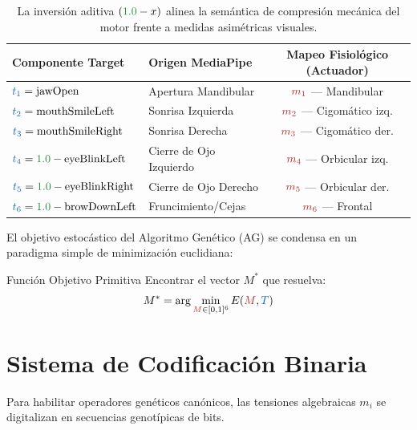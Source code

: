 \documentclass[11pt, a4paper]{article}
\begin{document}
\begin{table}[H]
    \centering
    \begin{tabular}{@{}llc@{}}
        \toprule
        \textbf{Componente Target} & \textbf{Origen MediaPipe} & \textbf{Mapeo Fisiológico (Actuador)} \\
        \midrule
        $\textcolor{coreblue}{t_1} = \text{jawOpen}$ & Apertura Mandibular & $\textcolor{corered}{m_1}$ — Mandibular \\
        $\textcolor{coreblue}{t_2} = \text{mouthSmileLeft}$ & Sonrisa Izquierda & $\textcolor{corered}{m_2}$ — Cigomático izq. \\
        $\textcolor{coreblue}{t_3} = \text{mouthSmileRight}$ & Sonrisa Derecha & $\textcolor{corered}{m_3}$ — Cigomático der. \\
        $\textcolor{coreblue}{t_4} = \textcolor{coregreen}{1.0} - \text{eyeBlinkLeft}$ & Cierre de Ojo Izquierdo & $\textcolor{corered}{m_4}$ — Orbicular izq. \\
        $\textcolor{coreblue}{t_5} = \textcolor{coregreen}{1.0} - \text{eyeBlinkRight}$ & Cierre de Ojo Derecho & $\textcolor{corered}{m_5}$ — Orbicular der. \\
        $\textcolor{coreblue}{t_6} = \textcolor{coregreen}{1.0} - \text{browDownLeft}$ & Fruncimiento/Cejas & $\textcolor{corered}{m_6}$ — Frontal \\
        \bottomrule
    \end{tabular}
    \caption{La inversión aditiva $(\textcolor{coregreen}{1.0} - x)$ alinea la semántica de compresión mecánica del motor frente a medidas asimétricas visuales.}
\end{table}

El objetivo estocástico del Algoritmo Genético (AG) se condensa en un paradigma simple de minimización euclidiana:
\begin{mathdef}{Función Objetivo Primitiva}
Encontrar el vector $M^*$ que resuelva:
$$M^* = \arg\min_{\textcolor{corered}{M} \in [0,1]^6} E(\textcolor{corered}{M}, \textcolor{coreblue}{T})$$
\end{mathdef}


\section{Sistema de Codificación Binaria}

Para habilitar operadores genéticos canónicos, las tensiones algebraicas $m_i$ se digitalizan en secuencias genotípicas de bits.
\end{document}
